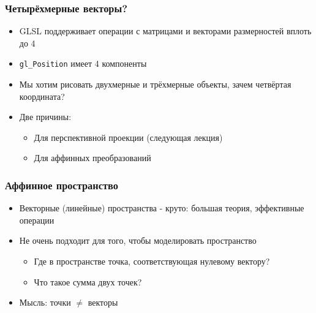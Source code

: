 \documentclass{beamer}
\begin{document}
\begin{frame}[fragile]
\frametitle{Четырёхмерные векторы?}
\begin{itemize}
\item GLSL поддерживает операции с матрицами и векторами размерностей вплоть до 4
\item \verb|gl_Position| имеет 4 компоненты
\pause
\item Мы хотим рисовать двухмерные и трёхмерные объекты, зачем четвёртая координата?
\pause
\item Две причины:
\pause
\begin{itemize}
\item Для перспективной проекции (следующая лекция)
\pause
\item Для аффинных преобразований
\end{itemize}
\end{itemize}
\end{frame}

\begin{frame}[fragile]
\frametitle{Аффинное пространство}
\begin{itemize}
\item Векторные (линейные) пространства - круто: большая теория, эффективные операции
\pause
\item Не очень подходит для того, чтобы моделировать пространство
\pause
\begin{itemize}
\item Где в пространстве точка, соответствующая нулевому вектору?
\pause
\item Что такое сумма двух точек?
\end{itemize}
\pause
\item Мысль: точки \begin{math}\neq\end{math} векторы
\end{itemize}
\end{frame}
\end{document}
